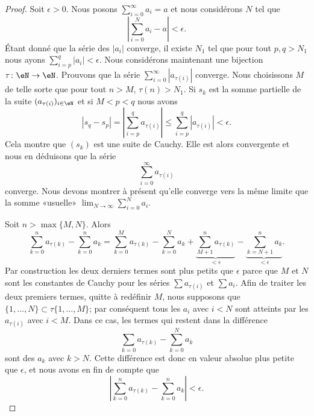 \begin{proof}
    Soit \( \epsilon>0\). Nous posons \( \sum_{i=0}^\infty a_i=a\) et nous considérons \( N\) tel que
    \begin{equation}
        | \sum_{i=0}^Na_i-a |<\epsilon.
    \end{equation}
    Étant donné que la série des \( | a_i |\) converge, il existe \( N_1\) tel que pour tout \( p,q>N_1\) nous ayons \( \sum_{i=p}^q| a_i |<\epsilon\). Nous considérons maintenant une bijection \( \tau\colon \eN\to \eN \). Prouvons que la série \( \sum_{i=0}^{\infty}| a_{\tau(i)} |\) converge. Nous choisissons \( M\) de telle sorte que pour tout \( n>M\), \( \tau(n)>N_1\). Si \( s_k\) est la somme partielle de la suite \( ( a_{\tau(i)} )_{i\in \eN}\) et si \( M<p<q \) nous avons
    \begin{equation}
        | s_q-s_p |= | \sum_{i=p}^q a_{\tau(i)} | \leq \sum_{i=p}^q| a_{\tau(i)} |<\epsilon.
    \end{equation}
    Cela montre que \( (s_k)\) est une suite de Cauchy. Elle est alors convergente et nous en déduisons que la série
    \begin{equation}
        \sum_{i=0}^{\infty}a_{\tau(i)}
    \end{equation}
    converge. Nous devons montrer à présent qu'elle converge vers la même limite que la somme «usuelle» \( \lim_{N\to \infty} \sum_{i=0}^Na_i\).

    Soit \( n>\max\{ M,N \}\). Alors
    \begin{equation}
        \sum_{k=0}^na_{\tau(k)}-\sum_{k=0}^na_k=\sum_{k=0}^Ma_{\tau(k)}-\sum_{k=0}^Na_k+\underbrace{\sum_{M+1}^na_{\tau(k)}}_{<\epsilon}-\underbrace{\sum_{k=N+1}^na_k}_{<\epsilon}.
    \end{equation}
    Par construction les deux derniers termes sont plus petits que \( \epsilon\) parce que \( M\) et \( N\) sont les constantes de Cauchy pour les séries \( \sum a_{\tau(i)}\) et \( \sum a_i\). Afin de traiter les deux premiers termes, quitte à redéfinir \( M\), nous supposons que \( \{ 1,\ldots, N \}\subset \tau\{ 1,\ldots, M \}\); par conséquent tous les \( a_i\) avec \( i<N\) sont atteints par les \( a_{\tau(i)}\) avec \( i<M\). Dans ce cas, les termes qui restent dans la différence
    \begin{equation}
        \sum_{k=0}a_{\tau(k)}-\sum_{k=0}^Na_k
    \end{equation}
    sont des \( a_k\) avec \( k>N\). Cette différence est donc en valeur absolue plus petite que \( \epsilon\), et nous avons en fin de compte que
    \begin{equation}
        \left| \sum_{k=0}^na_{\tau(k)}-\sum_{k=0}^na_k \right| <\epsilon.
    \end{equation}
\end{proof}

